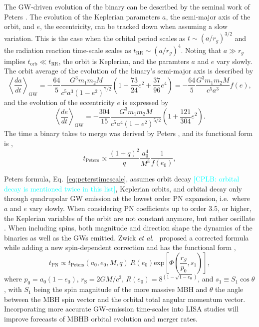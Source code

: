 \documentclass[a4paper,12pt]{article}
\newcommand{\cplb}[1]{\textcolor{cyan}{[CPLB: #1]}}
\begin{document}
The GW-driven evolution of the binary can be described by the seminal work of Peters \cite{peters1964gravitational}. The evolution of the Keplerian parameters $a$, the semi-major axis of the orbit, and $e$, the eccentricity, can be tracked down when assuming a slow variation. This is the case when the orbital period scales as $t\sim(a/r_{g})^{3/2}$ and the radiation reaction time-scale scales as $t_{\mathrm{RR}}\sim(a/r_{g})^{4}$. Noting that $a\gg r_{g}$ implies $t_{\mathrm{orb}}\ll t_{\mathrm{RR}}$, the orbit is Keplerian, and the paramters $a$ and $e$ vary slowly. The orbit average of the evolution of the binary's semi-major axis is described by \cite{peters1964gravitational}
\begin{equation}
\left\langle \frac{da}{dt}\right\rangle_{\mathrm{GW}} = -\frac{64}{5}\frac{G^{3}m_{1}m_{2}M}{c^{5}a^{3}(1-e^{2})^{7/2}}\left(1+\frac{73}{24}e^{2}+\frac{37}{96}e^{4}\right) = -\frac{64}{5}\frac{G^{3}m_{1}m_{2}M}{c^{5}a^{3}}f(e),
\label{eq:dadt}
\end{equation} 
and the evolution of the eccentricity $e$ is expressed by
\begin{equation}
\left\langle \frac{de}{dt}\right\rangle_{\mathrm{GW}} = -\frac{304}{15}\frac{G^{3}m_{1}m_{2}M}{c^{5}a^{4}(1-e^{2})^{5/2}}\left(1+\frac{121}{304}e^{2}\right).
\label{eq:dedt}
\end{equation}
The time a binary takes to merge was derived by Peters \cite{peters1964gravitational}, and its functional form is \cite{amaro2023astrophysics}, 
\begin{equation}
t_{\mathrm{Peters}} \propto\frac{(1+q)^{2}}{q}\frac{a^{4}_{0}}{M^{3}}\frac{1}{f(e_{0})},
\label{eq:peterstimescale}
\end{equation}

Peters formula, Eq.~\eqref{eq:peterstimescale}, assumes orbit decay \cplb{orbital decay is mentioned twice in this list}, Keplerian orbits, and orbital decay only through quadrupolar GW emission at the lowest order PN expansion, i.e.\ where $a$ and $e$ vary slowly. When considering PN coefficients up to order 3.5, or higher, the Keplerian variables of the orbit are not constant anymore, but rather oscillate \cite{will2014confrontation,mannerkoski2019gravitational,memmesheimer2004third}. When including spins, both magnitude and direction shape the dynamics of the binaries as well as the GWs emitted. Zwick \textit{et al}.\ \cite{zwick2020improved} proposed a corrected formula while adding a new spin-dependent correction and has the functional form \cite{amaro2023astrophysics},
\begin{equation}
t_{\mathrm{PN}} \propto t_{\mathrm{Peters}}(a_{0},e_{0},M,q)~R(e_{0})\mathrm{exp}\left[\Phi\left(\frac{r_{S}}{p_{0}},s_{1}\right)\right],
\label{eq:peterstimescalecorr}
\end{equation}
where $p_{0}=a_{0}(1-e_{0})$, $r_{\mathrm{S}}=2G
M/c^{2}$, $R(e_{0})=8^{(1-\sqrt{1-e_{0}})}$, and $s_{1}\equiv S_{1}\cos\theta$, with $S_{1}$ being the spin magnitude of the more massive MBH and $\theta$ the angle between the MBH spin vector and the orbital total angular momentum vector. Incorporating more accurate GW-emission time-scales into LISA studies will improve forecasts of MBHB orbital evolution and merger rates.
\end{document}
